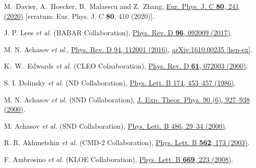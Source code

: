 \documentclass[twocolumn,aps,prd,floatfix,nofootinbib,superscriptaddress]{revtex4-2}
\begin{document}
\begin{thebibliography}{9}

M.~Davier, A.~Hoecker, B.~Malaescu and Z.~Zhang,
\href{https://doi.org/10.1140/epjc/s10052-020-7792-2}
{Eur. Phys. J. C \textbf{80}, 241 (2020)}
[erratum: Eur. Phys. J. C \textbf{80}, 410 (2020)].

J. P. Lees \emph{et al.} (BABAR Collaboration), 
\href{https://doi.org/10.1103/PhysRevD.96.092009}
{Phys. Rev. D \textbf{96}, 092009 (2017)}.

M. N. Achasov \emph{et al.},
\href{https://journals.aps.org/prd/abstract/10.1103/PhysRevD.94.112001}{Phys. Rev. D 94, 112001 (2016)},
\href{https://arxiv.org/abs/1610.00235}{arXiv:1610.00235 [hep-ex]}.

K.~W.~Edwards \textit{et al.} (CLEO Colaaboration),
\href{https://doi.org/10.1103/PhysRevD.61.072003}
{Phys. Rev. D \textbf{61}, 072003 (2000)}.

S. I. Dolinsky \emph{et al.} (ND Collaboration),
\href{https://doi.org/10.1016/0370-2693(86)91036-1}
{Phys. Lett. B 174, 453--457 (1986)}.

M. N. Achasov \emph{et al.} (SND Collaboration),
\href{https://doi.org/10.1134/1.559181}
{J. Exp. Theor. Phys. 90 (6), 927--938 (2000)}.

M. Achasov \emph{et al.} (SND Collaboration),
\href{https://doi.org/10.1016/S0370-2693(00)00706-1}{Phys. Lett. B 486, 29--34 (2000)}.

R. R. Akhmetshin \emph{et al.} (CMD-2 Collaboration),
\href{https://doi.org/10.1016/S0370-2693(03)00595-1}
{Phys. Lett. B \textbf{562}, 173 (2003)}.

F. Ambrosino \emph{et al.} (KLOE Collaboration),
\href{https://doi.org/10.1016/j.physletb.2008.09.056}
{Phys. Lett. B \textbf{669}, 223 (2008)}.


\end{thebibliography}
\end{document}
